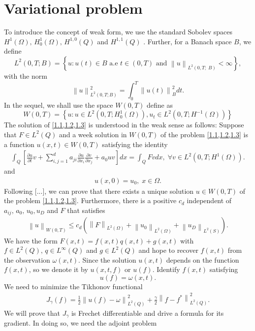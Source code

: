 \documentclass[]{article}
\begin{document}
\section{Variational problem}\label{section2}
To introduce the concept of weak form, we use the standard Sobolev spaces $H^1(\Omega),\, H^1_0(\Omega),\, H^{1, 0}(Q)$ and $H^{1, 1}(Q)$ \cite{b1, b2, b3}. Further, for a Banach space $B$, we define
$$L^2(0, T; B)=\left\{u:u(t)\in B \text{ a.e } t\in (0, T) \text{ and } \left\|u\right\|_{L^2(0, T;\; B)} <\infty \right\},$$
with the norm
$$\left\|u\right\|_{L^2(0, T; B)}^2=\int_0^T\left\|u(t)\right\|^2_Bdt.$$
In the sequel, we shall use the space $W(0, T)$ define as
$$W(0, T)=\left\{u: u\in L^2(0, T; H^1_0(\Omega)), u_t\in L^2\left(0, T; H^{-1}(\Omega) \right)\right\}$$
The solution of  \cref{1.1,1.2,1.3} is understood in the weak sense as follows: Suppose that $F\in L^2(Q)$ and a week solution in $W(0, T)$ of the problem \cref{1.1,1.2,1.3} is a function $u(x, t)\in W(0, T)$ satisfying the identity
\begin{align}\label{2.1}
	\int_{Q}\left[\frac{\partial u}{\partial t}v+\sum_{i, j=1}^{d}a_{ji}\frac{\partial u}{\partial x_i}\frac{\partial v}{\partial x_j}+a_0uv\right]dx=\int_{Q}Fvdx,\;\forall v \in L^2\left(0, T; H^1(\Omega)\right).
\end{align}
and 
\begin{align}\label{2.2}
	u(x, 0)=u_0,\; x\in \Omega.
\end{align}
Following [...], we can prove that there exists a unique solution $u\in W(0, T)$ of the problem \cref{1.1,1.2,1.3}. Furthermore, there is a positive $c_d$ independent of $a_{ij},\, a_0, \,u_0, u_D$ and $F$ that satisfies 
\begin{align}\label{2.3}
	\left\|u\right\|_{W(0, T)} \leq c_d \left(\left\|F\right\|_{L^2\left(\Omega\right)}+\left\|u_0\right\|_{L^2(\Omega)}+\left\|u_D\right\|_{L^2(S)}\right).
\end{align}
We have the form $F(x, t)=f(x, t)q(x, t)+g(x, t)$ with $f\in L^2(Q),\, q\in L^\infty(Q)$ and $g\in L^2(Q)$ and hope to recover $f(x, t)$ from the observation $\omega(x, t)$. Since the solution $u(x, t)$ depends on the function $f(x, t)$, so we denote it by $u(x, t, f)$ or $u(f)$. Identify $f(x, t)$ satisfying 
$$u(f)=\omega(x, t).$$
We need to minimize the Tikhonov functional
\begin{align}\label{2.4}
	J_{\gamma}(f)=\frac{1}{2}\left\|u(f)-\omega\right\|_{L^2(Q)}^2+\frac{\gamma}{2}\left\|f-f^*\right\|_{L^2(Q)}^2.
\end{align}
We will prove that $J_\gamma$ is Frechet differentiable and drive a formula for its gradient. In doing so, we need the adjoint problem
\end{document}

